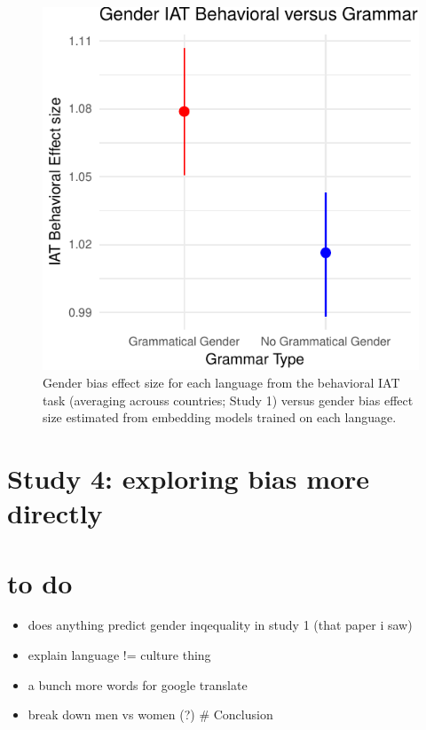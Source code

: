 \documentclass[10pt, letterpaper]{article}
\newenvironment{CodeChunk}{}{}
\begin{document}
\begin{CodeChunk}
\begin{figure}[t]

{\centering \includegraphics{figs/grammatical_gender_plot-1} 

}

\caption[Gender bias effect size for each language from the behavioral IAT task (averaging acrouss countries]{Gender bias effect size for each language from the behavioral IAT task (averaging acrouss countries; Study 1) versus gender bias effect size estimated from embedding models trained on each language.}\label{fig:grammatical_gender_plot}
\end{figure}
\end{CodeChunk}

\section{Study 4: exploring bias more
directly}\label{study-4-exploring-bias-more-directly}

\section{to do}\label{to-do}

\begin{itemize}
\tightlist
\item
  does anything predict gender inqequality in study 1 (that paper i saw)
\item
  explain language != culture thing
\item
  a bunch more words for google translate
\item
  break down men vs women (?) \# Conclusion
\end{itemize}
\end{document}
